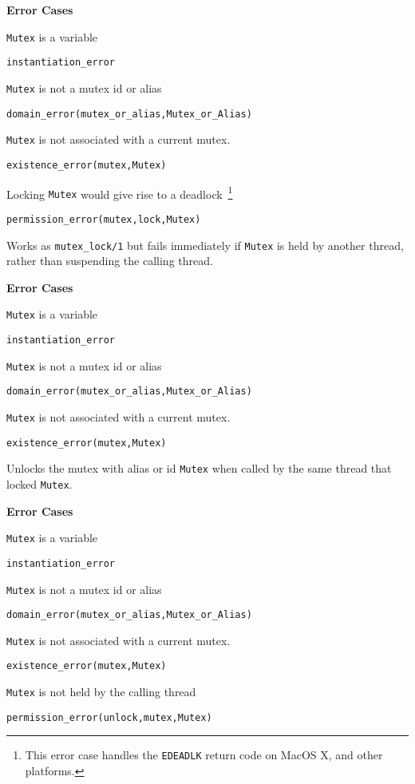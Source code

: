 \begin{description}
{\bf Error Cases}
\bi
\item 	{\tt Mutex} is a variable
\bi
\item 	{\tt instantiation\_error}
\ei
%
\item 	{\tt Mutex} is not a mutex id or alias
\bi
\item 	{\tt domain\_error(mutex\_or\_alias,Mutex\_or\_Alias)}
\ei
%
\item 	{\tt Mutex} is not associated with a current mutex.
\bi
\item 	{\tt existence\_error(mutex,Mutex)}
\ei
\item Locking {\tt Mutex} would give rise to a deadlock~\footnote{This
  error case handles the {\tt EDEADLK} return code on MacOS X, and other
  platforms.}
\bi
\item 	{\tt permission\_error(mutex,lock,Mutex)}
\ei
\ei

%
Works as {\tt mutex\_lock/1} but fails immediately if {\tt Mutex} is
held by another thread,  rather than suspending the calling thread.

{\bf Error Cases}
\bi
\item 	{\tt Mutex} is a variable
\bi
\item 	{\tt instantiation\_error}
\ei
%
\item 	{\tt Mutex} is not a mutex id or alias
\bi
\item 	{\tt domain\_error(mutex\_or\_alias,Mutex\_or\_Alias)}
\ei
%
\item 	{\tt Mutex} is not associated with a current mutex.
\bi
\item 	{\tt existence\_error(mutex,Mutex)}
\ei
\ei

%
Unlocks the mutex with alias or id {\tt Mutex} when called by the same
thread that locked {\tt Mutex}.

{\bf Error Cases}
\bi
\item 	{\tt Mutex} is a variable
\bi
\item 	{\tt instantiation\_error}
\ei
%
\item 	{\tt Mutex} is not a mutex id or alias
\bi
\item 	{\tt domain\_error(mutex\_or\_alias,Mutex\_or\_Alias)}
\ei
%
\item 	{\tt Mutex} is not associated with a current mutex.
\bi
\item 	{\tt existence\_error(mutex,Mutex)}
\ei
\item 	{\tt Mutex} is not held by the calling thread
\bi
\item 	{\tt permission\_error(unlock,mutex,Mutex)}
\ei
\ei


\end{description}
